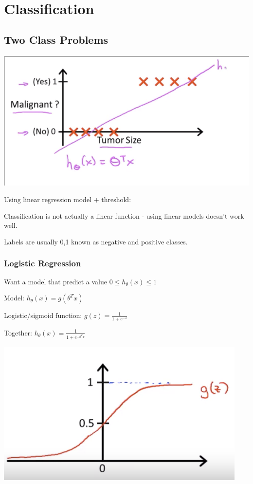 \section{Classification}

\subsection{Two Class Problems}
\includegraphics[width=0.9\columnwidth]{ml_figures/log_threshold.png}

Using linear regression model + threshold:

Classification is not actually a linear function - using linear models doesn't work well.

Labels are usually {0,1} known as negative and positive classes.

\subsubsection{Logistic Regression}

Want a model that predict a value $0\le h_\theta(x)\le 1$

Model: $h_\theta(x)=g(\theta^T x)$ 

Logistic/sigmoid function: $g(z) = \frac{1}{1+e^{-z}}$

Together: $h_\theta(x)=\frac{1}{1+e^{-\theta^T x}}$

\includegraphics[width=0.9\columnwidth]{ml_figures/sigmoid.png}

